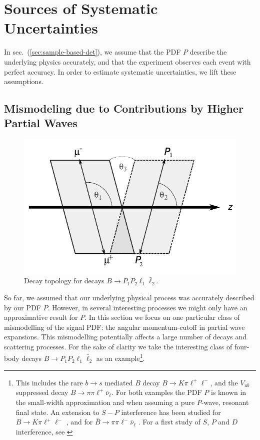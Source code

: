 \documentclass[aps,prd,reprint,nofootinbib,preprintnumbers]{revtex4}
\newcommand{\refsec}[1]{sec.~(\ref{sec:#1})}
\begin{document}
\section{Sources of Systematic Uncertainties}
\label{sec:systematics}

In \refsec{sample-based-det}, we assume that the PDF $P$ describe the underlying physics accurately,
and that the experiment observes each event with perfect accuracy. In order to estimate systematic
uncertainties, we lift these assumptions.

\subsection{Mismodeling due to Contributions by Higher Partial Waves}
\label{sec:systematics:partial-waves}

\begin{figure}
    \includegraphics[width=.6\textwidth]{fig-topology.pdf}
    \caption{Decay topology for decays $B\to P_1 P_2 \ell_1 \bar\ell_2$. \label{fig:topology}}
\end{figure}

So far, we assumed that our underlying physical process was accurately described by our PDF $P$.
However, in several interesting processes we might only have an approximative result for $P$.
In this section we focus on one particular class of mismodelling of the signal PDF: the angular
momentum-cutoff in partial wave expansions. This mismodelling potentially affects a large
number of decays and scattering processes. For the sake of clarity we take the interesting class
of four-body decays $B\to P_1 P_2 \ell_1 \bar\ell_2$ as an example\footnote{This includes the rare $b\to s$ mediated $B$ decay $B \to K\pi\ell^+\ell^-$, and
the $V_{ub}$ suppressed decay $B\to \pi\pi\ell^+\bar\nu_\ell$. For both examples the PDF $P$ is known in
the small-width approximation and when assuming a pure $P$-wave, resonant final state. An extension to
$S-P$ interference has been studied for $B\to K\pi\ell^+\ell^-$ \cite{Blake:2012mb,Becirevic:2011bp},
and for $\bar{B}\to \pi\pi\ell^-\bar\nu_\ell$ \cite{Faller:2013dwa}. For a first study of $S$, $P$
and $D$ interference, see \cite{Das:2014sra}}.\\
\end{document}
